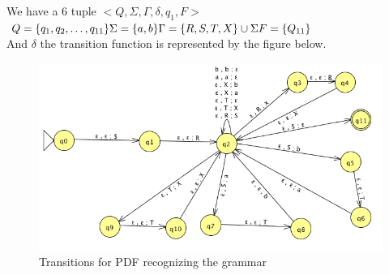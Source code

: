 \begin{problem}{1}
\begin{solution}
\begin{figure}[H]
{      }
    \end{figure}
  \end{solution}
\end{problem}

\begin{problem}{2}
\end{problem}

\begin{problem}{3}
  \begin{solution}
    We have a 6 tuple $<Q, \Sigma, \Gamma, \delta, q_1, F>$ \\
    \(
      Q = \{ q_1, q_2, \ldots, q_{11} \} \\
      \Sigma = \{ a, b \} \\
      \Gamma = \{R, S, T, X \} \cup \Sigma \\
      F = \{ Q_{11} \}
    \) \\
    And $\delta$ the transition function is represented by the figure below.
    \begin{figure}[H]
      \centering
      \caption{Transitions for PDF recognizing the grammar}
      \includegraphics[scale=.6]{problem_2.png}
    \end{figure}
  \end{solution}
\end{problem}

